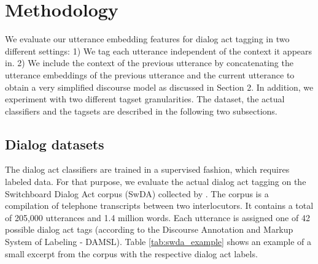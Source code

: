 \section{Methodology}\label{sec:method}
%

We evaluate our utterance embedding features for dialog act tagging in two different settings:
1) We tag each utterance independent of the context it appears in.
2) We include the context of the previous utterance by concatenating the utterance embeddings of the previous utterance and the current utterance to obtain a very simplified discourse model as discussed in Section 2.
In addition, we experiment with two different tagset granularities.
The dataset, the actual classifiers and the tagsets are described in the following two subsections.

\subsection{Dialog datasets}

The dialog act classifiers are trained in a supervised fashion, which requires labeled data.
For that purpose, we evaluate the actual dialog act tagging on the Switchboard Dialog Act corpus (SwDA) collected by .
The corpus is a compilation of telephone transcripts between two interlocutors.
It contains a total of 205,000 utterances and 1.4 million words.
Each utterance is assigned one of 42 possible dialog act tags (according to the Discourse Annotation and Markup System of Labeling - DAMSL).
Table \ref{tab:swda_example} shows an example of a small excerpt from the corpus with the respective dialog act labels. 

